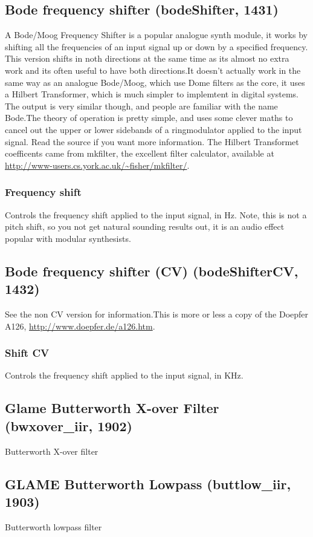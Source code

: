 \documentclass[11pt]{article}
\begin{document}
                \subsection{Bode frequency shifter (bodeShifter, 1431)\label{bodeShifter}\label{id1431}}
A Bode/Moog Frequency Shifter is a popular analogue synth module, it works by shifting all the frequencies of an input signal up or down by a specified frequency. This version shifts in noth directions at the same time as its almost no extra work and its often useful to have both directions.It doesn't actually work in the same way as an analogue Bode/Moog, which use Dome filters as the core, it uses a Hilbert Transformer, which is much simpler to implemtent in digital systems. The output is very similar though, and people are familiar with the name Bode.The theory of operation is pretty simple, and uses some clever maths to cancel out the upper or lower sidebands of a ringmodulator applied to the input signal. Read the source if you want more information. The Hilbert Transformet coefficents came from mkfilter, the excellent filter calculator, available at \url{http://www-users.cs.york.ac.uk/~fisher/mkfilter/}.\subsubsection*{Frequency shift}
Controls the frequency shift applied to the input signal, in Hz. Note, this is not a pitch shift, so you not get natural sounding results out, it is an audio effect popular with modular synthesists.\subsection{Bode frequency shifter (CV) (bodeShifterCV, 1432)\label{bodeShifterCV}\label{id1432}}
See the non CV version for information.This is more or less a copy of the Doepfer A126, \url{http://www.doepfer.de/a126.htm}.\subsubsection*{Shift CV}
Controls the frequency shift applied to the input signal, in KHz.\subsection{Glame Butterworth X-over Filter (bwxover\_iir, 1902)\label{bwxover_iir}\label{id1902}}
 Butterworth X-over filter
                \subsection{GLAME Butterworth Lowpass (buttlow\_iir, 1903)\label{buttlow_iir}\label{id1903}}
 Butterworth lowpass filter
\end{document}
